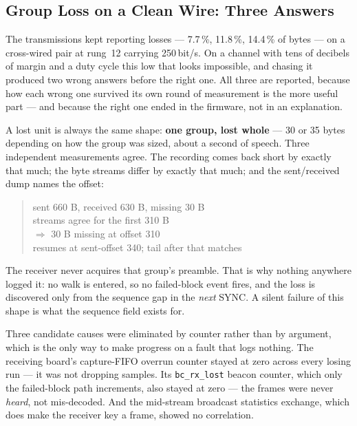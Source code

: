 \subsection{Group Loss on a Clean Wire: Three Answers}
\label{sec:voice_loss}

The transmissions kept reporting losses --- 7.7\,\%, 11.8\,\%,
14.4\,\% of bytes --- on a cross-wired pair at rung~12 carrying
250\,bit/s.  On a channel with tens of decibels of margin and a duty
cycle this low that looks impossible, and chasing it produced two
wrong answers before the right one.  All three are reported, because
how each wrong one survived its own round of measurement is the more
useful part --- and because the right one ended in the firmware, not
in an explanation.

A lost unit is always the same shape: \textbf{one group, lost whole}
--- 30 or 35 bytes depending on how the group was sized, about a
second of speech.  Three independent measurements agree.  The recording
comes back short by exactly that much; the byte streams differ by
exactly that much; and the sent/received dump names the offset:

\begin{quote}\ttfamily\small
sent 660 B, received 630 B, missing 30 B\\
streams agree for the first 310 B\\
$\Rightarrow$ 30 B missing at offset 310\\
\hphantom{$\Rightarrow$} resumes at sent-offset 340; tail after that matches
\end{quote}

\noindent
The receiver never acquires that group's preamble.  That is why nothing
anywhere logged it: no walk is entered, so no failed-block event fires,
and the loss is discovered only from the sequence gap in the \emph{next}
SYNC\@.  A silent failure of this shape is what the sequence field
exists for.

Three candidate causes were eliminated by counter rather than by
argument, which is the only way to make progress on a fault that logs
nothing.  The receiving board's capture-FIFO overrun counter stayed at
zero across every losing run --- it was not dropping samples.  Its
\texttt{bc\_rx\_lost} beacon counter, which only the failed-block path
increments, also stayed at zero --- the frames were never \emph{heard},
not mis-decoded.  And the mid-stream broadcast statistics exchange,
which does make the receiver key a frame, showed no correlation.

